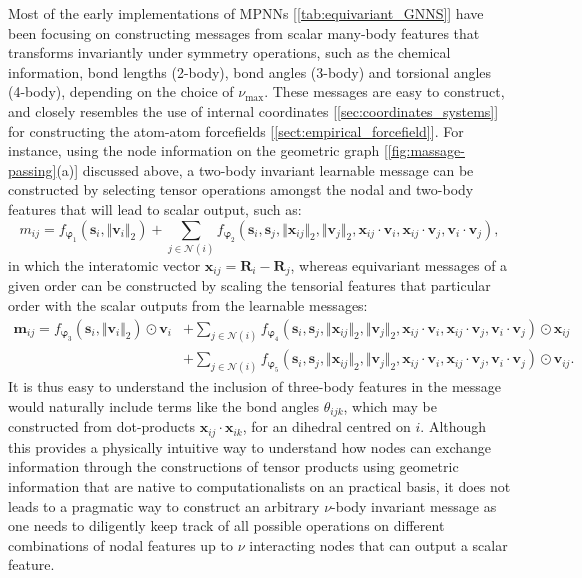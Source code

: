 Most of the early implementations of MPNNs [\cref{tab:equivariant_GNNS}] have been focusing on constructing messages from scalar many-body features that transforms invariantly under symmetry operations, such as the chemical information, bond lengths (2-body), bond angles (3-body) and torsional angles (4-body), depending on the choice of $\nu_{\max}$. These messages are easy to construct, and closely resembles the use of internal coordinates [\cref{sec:coordinates_systems}] for constructing the atom-atom forcefields [\cref{sect:empirical_forcefield}]. For instance, using the node information on the geometric graph [\cref{fig:massage-passing}(a)] discussed above, a two-body invariant learnable message can be constructed by selecting tensor operations amongst the nodal and two-body features that will lead to scalar output, such as:\cite{duval2023hitchhiker}
\begin{equation}
    \label{eq:2-body-invariant-message}
    m_{ij}=f_{\boldsymbol{\varphi}_1}\left(\bm{s}_i,\Vert \bm{v}_i\Vert_2\right)+\sum_{j\in\mathcal{N}(i)}f_{\boldsymbol{\varphi}_2}(
    \bm{s}_i,
    \bm{s}_j,
    \Vert \bm{x}_{ij}\Vert_2,
    \Vert \bm{v}_j\Vert_2,
    \bm{x}_{ij}\cdot\bm{v}_i,
    \bm{x}_{ij}\cdot\bm{v}_j,
    \bm{v}_{i}\cdot\bm{v}_j),
\end{equation}
in which the interatomic vector $\bm{x}_{ij}=\bm{R}_i-\bm{R}_j$, whereas equivariant messages of a given order can be constructed by scaling the tensorial features that particular order with the scalar outputs from the learnable messages:
\begin{align}
\bm{m}_{ij}=f_{\boldsymbol{\varphi}_3}\left(\bm{s}_i,\Vert \bm{v}_i\Vert_2\right)\odot \bm{v}_i &+ \sum_{j\in\mathcal{N}(i)}f_{\boldsymbol{\varphi}_4}(
    \bm{s}_i,
    \bm{s}_j,
    \Vert \bm{x}_{ij}\Vert_2,
    \Vert \bm{v}_j\Vert_2,
    \bm{x}_{ij}\cdot\bm{v}_i,
    \bm{x}_{ij}\cdot\bm{v}_j,
    \bm{v}_{i}\cdot\bm{v}_j)\odot\bm{x}_{ij}\nonumber\\
    &+\sum_{j\in\mathcal{N}(i)}f_{\boldsymbol{\varphi}_5}(
    \bm{s}_i,
    \bm{s}_j,
    \Vert \bm{x}_{ij}\Vert_2,
    \Vert \bm{v}_j\Vert_2,
    \bm{x}_{ij}\cdot\bm{v}_i,
    \bm{x}_{ij}\cdot\bm{v}_j,
    \bm{v}_{i}\cdot\bm{v}_j)\odot\bm{v}_{ij}.
    \label{eq:2-body-equivariant-message}
\end{align}
It is thus easy to understand the inclusion of three-body features in the message would naturally include terms like the bond angles $\theta_{ijk}$, which may be constructed from dot-products $\bm{x}_{ij}\cdot\bm{x}_{ik}$, for an dihedral centred on $i$. Although this provides a physically intuitive way to understand how nodes can exchange information through the constructions of tensor products using geometric information that are native to computationalists on an practical basis, it does not leads to a pragmatic way to construct an arbitrary $\nu$-body invariant message as one needs to diligently keep track of all possible operations on different combinations of nodal features up to $\nu$ interacting nodes that can output a scalar feature.

